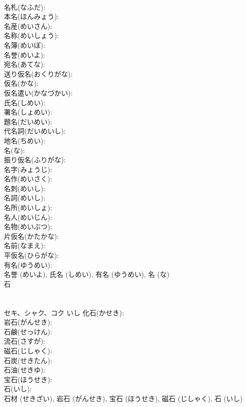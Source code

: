 \documentclass[8pt]{extreport}
\begin{document}
\begin{CJK}{UTF8}{min}
\\	名札(なふだ): 
\\	本名(ほんみょう): 
\\	名産(めいさん): 
\\	名称(めいしょう): 
\\	名簿(めいぼ): 
\\	名誉(めいよ): 
\\	宛名(あてな): 
\\	送り仮名(おくりがな): 
\\	仮名(かな): 
\\	仮名遣い(かなづかい): 
\\	氏名(しめい): 
\\	署名(しょめい): 
\\	題名(だいめい): 
\\	代名詞(だいめいし): 
\\	地名(ちめい): 
\\	名(な): 
\\	振り仮名(ふりがな): 
\\	名字(みょうじ): 
\\	名作(めいさく): 
\\	名刺(めいし): 
\\	名詞(めいし): 
\\	名所(めいしょ): 
\\	名人(めいじん): 
\\	名物(めいぶつ): 
\\	片仮名(かたかな): 
\\	名前(なまえ): 
\\	平仮名(ひらがな): 
\\	有名(ゆうめい): 
\\	名誉 (めいよ), 氏名 (しめい), 有名 (ゆうめい), 名 (な)
\\	石			
\\	[いし] 
\\	[ほうせき] 
\\	セキ、シャク、コク	いし	化石(かせき): 
\\	岩石(がんせき): 
\\	石鹸(せっけん): 
\\	流石(さすが): 
\\	磁石(じしゃく): 
\\	石炭(せきたん): 
\\	石油(せきゆ): 
\\	宝石(ほうせき): 
\\	石(いし): 
\\	石材 (せきざい), 岩石 (がんせき), 宝石 (ほうせき), 磁石 (じしゃく), 石 (いし)

\end{CJK}
\end{document}
